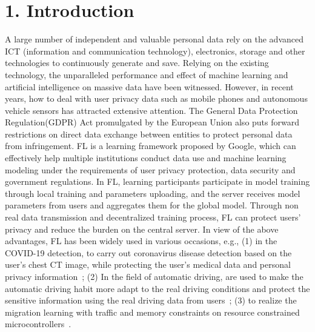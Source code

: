 \documentclass[twoside,twocolumn]{article}
\begin{document}
\section{1. Introduction}

	A large number of independent and valuable personal data rely on the advanced ICT (information and communication technology), electronics, storage and other technologies to continuously generate and save. Relying on the existing technology, the unparalleled performance and effect of machine learning and artificial intelligence on massive data have been witnessed. However, in recent years, how to deal with user privacy data such as mobile phones and autonomous vehicle sensors has attracted extensive attention. The General Data Protection Regulation(GDPR) Act promulgated by the European Union also puts forward restrictions on direct data exchange between entities to protect personal data from infringement. FL is a learning framework proposed by Google, which can effectively help multiple institutions conduct data use and machine learning modeling under the requirements of user privacy protection, data security and government regulations. In FL, learning participants participate in model training through local training and parameters uploading, and the server receives model parameters from users and aggregates them for the global model. Through non real data transmission and decentralized training process, FL can protect users' privacy and reduce the burden on the central server. In view of the above advantages, FL has been widely used in various occasions, e.g., (1) in the COVID-19 detection, to carry out coronavirus disease detection based on the user's chest CT image, while protecting the user's medical data and personal privacy information~\cite{kumar2021blockchain}; (2) In the field of automatic driving, are used to make the automatic driving habit more adapt to the real driving conditions and protect the sensitive information using the real driving data from users~\cite{li2021privacy}; (3) to realize the migration learning with traffic and memory constraints on resource constrained microcontrollers~\cite{kopparapu2022tinyfedtl}.
	
\end{document}

